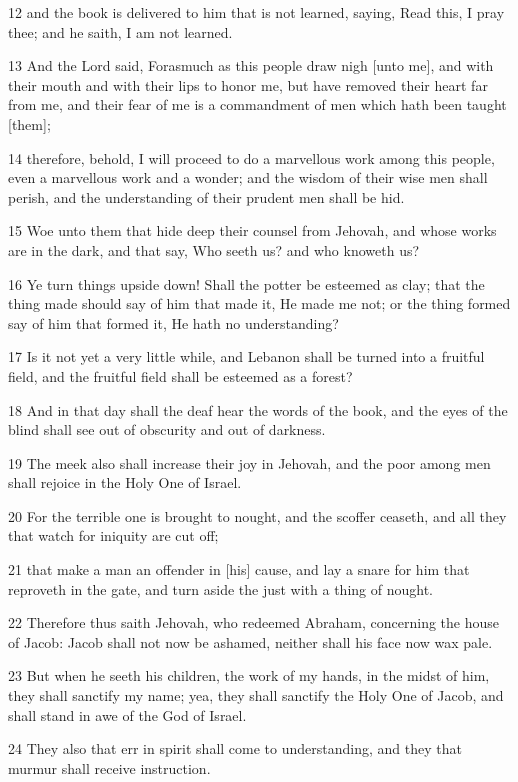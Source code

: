 \par 12 and the book is delivered to him that is not learned, saying, Read this, I pray thee; and he saith, I am not learned.
\par 13 And the Lord said, Forasmuch as this people draw nigh [unto me], and with their mouth and with their lips to honor me, but have removed their heart far from me, and their fear of me is a commandment of men which hath been taught [them];
\par 14 therefore, behold, I will proceed to do a marvellous work among this people, even a marvellous work and a wonder; and the wisdom of their wise men shall perish, and the understanding of their prudent men shall be hid.
\par 15 Woe unto them that hide deep their counsel from Jehovah, and whose works are in the dark, and that say, Who seeth us? and who knoweth us?
\par 16 Ye turn things upside down! Shall the potter be esteemed as clay; that the thing made should say of him that made it, He made me not; or the thing formed say of him that formed it, He hath no understanding?
\par 17 Is it not yet a very little while, and Lebanon shall be turned into a fruitful field, and the fruitful field shall be esteemed as a forest?
\par 18 And in that day shall the deaf hear the words of the book, and the eyes of the blind shall see out of obscurity and out of darkness.
\par 19 The meek also shall increase their joy in Jehovah, and the poor among men shall rejoice in the Holy One of Israel.
\par 20 For the terrible one is brought to nought, and the scoffer ceaseth, and all they that watch for iniquity are cut off;
\par 21 that make a man an offender in [his] cause, and lay a snare for him that reproveth in the gate, and turn aside the just with a thing of nought.
\par 22 Therefore thus saith Jehovah, who redeemed Abraham, concerning the house of Jacob: Jacob shall not now be ashamed, neither shall his face now wax pale.
\par 23 But when he seeth his children, the work of my hands, in the midst of him, they shall sanctify my name; yea, they shall sanctify the Holy One of Jacob, and shall stand in awe of the God of Israel.
\par 24 They also that err in spirit shall come to understanding, and they that murmur shall receive instruction.

